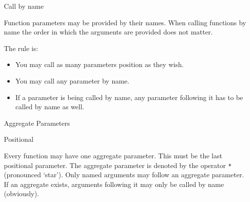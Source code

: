 \begin{frame}[fragile]{Call by name}

Function parameters may be provided by their names. When calling
functions by name the order in which the arguments are provided does not
matter.

\begin{Shaded}
\begin{Highlighting}[]
 
     

\NormalTok{, }\NormalTok{, }\NormalTok{)}
\OperatorTok{=}\OperatorTok{=}\OperatorTok{=}\NormalTok{)}
\OperatorTok{=}\OperatorTok{=}\NormalTok{)}
\OperatorTok{=}\OperatorTok{=}\NormalTok{)}
\end{Highlighting}
\end{Shaded}

\end{frame}

\begin{frame}

The rule is:

\begin{itemize}
\tightlist
\item
  You may call as many parameters position as they wish.
\item
  You may call any parameter by name.
\item
  If a parameter is being called by name, any parameter following it has
  to be called by name as well.
\end{itemize}

\end{frame}

\begin{frame}{Aggregate Parameters}

\end{frame}

\begin{frame}

\begin{block}{Positional}

Every function may have one aggregate parameter. This must be the last
positional parameter. The aggregate parameter is denoted by the operator
\texttt{*} (pronounced `star'). Only named arguments may follow an
aggregate parameter. If an aggregate exists, arguments following it may
only be called by name (obviously).

\end{block}

\end{frame}

